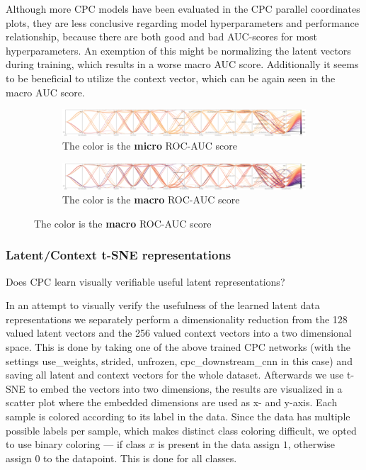 Although more CPC models have been evaluated in the CPC parallel coordinates plots, they are less conclusive regarding model hyperparameters and performance relationship, because there are both good and bad AUC-scores for most hyperparameters. An exemption of this might be normalizing the latent vectors during training, which results in a worse macro AUC score. Additionally it seems to be beneficial to utilize the context vector, which can be again seen in the macro AUC score.

\begin{figure}[H]
	\caption{Parallel Coordinates Plot for all trained baseline networks from \autoref{tbl:aucscores-avg-bl-class-stab}.}
	\begin{subfigure}[t]{\textwidth}\centering
		\includegraphics[width=1\linewidth]{bilder/lowlabel-paarcords-cpc-micro.png}
		\caption{The color is the \textbf{micro} ROC-AUC score}
		\label{fig:cpc-parcoords-micro}	
	\end{subfigure}
	\begin{subfigure}[t]{\textwidth}\centering
		\includegraphics[width=1\linewidth]{bilder/lowlabel-paarcords-cpc.png}
		\caption{The color is the \textbf{macro} ROC-AUC score}
		\label{fig:cpc-parcoords-macro}	
	\end{subfigure}
\end{figure}


\subsubsection{Latent/Context t-SNE representations}
Does CPC learn visually verifiable useful latent representations?

In an attempt to visually verify the usefulness of the learned latent data representations we separately perform a dimensionality reduction from the 128 valued latent vectors and the 256 valued context vectors into a two dimensional space. This is done by taking one of the above trained CPC networks (with the settings use\_weights, strided, unfrozen, cpc\_downstream\_cnn in this case) and saving all latent and context vectors for the whole dataset. Afterwards we use t-SNE \autocite{JMLR:v9:vandermaaten08a} to embed the vectors into two dimensions, the results are visualized in a scatter plot where the embedded dimensions are used as x- and y-axis. Each sample is colored according to its label in the data. Since the data has multiple possible labels per sample, which makes distinct class coloring difficult, we opted to use binary coloring --- if class $x$ is present in the data assign $1$, otherwise assign $0$ to the datapoint. This is done for all classes.

